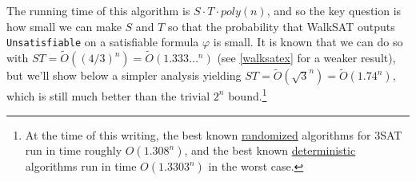 The running time of this algorithm is \(S\cdot T \cdot poly(n)\), and so
the key question is how small we can make \(S\) and \(T\) so that the
probability that WalkSAT outputs \texttt{Unsatisfiable} on a satisfiable
formula \(\varphi\) is small. It is known that we can do so with
\(\ensuremath{\mathit{ST}} = \tilde{O}((4/3)^n) = \tilde{O}(1.333\ldots^n)\)
(see \cref{walksatex} for a weaker result), but we'll show below a
simpler analysis yielding
\(\ensuremath{\mathit{ST}}= \tilde{O}(\sqrt{3}^n) = \tilde{O}(1.74^n)\),
which is still much better than the trivial \(2^n\) bound.\footnote{At
  the time of this writing, the best known
  \href{https://arxiv.org/pdf/1103.2165.pdf}{randomized} algorithms for
  3SAT run in time roughly \(O(1.308^n)\), and the best known
  \href{https://arxiv.org/pdf/1102.3766v1.pdf}{deterministic} algorithms
  run in time \(O(1.3303^n)\) in the worst case.}

\hypertarget{walksatthm}{}

